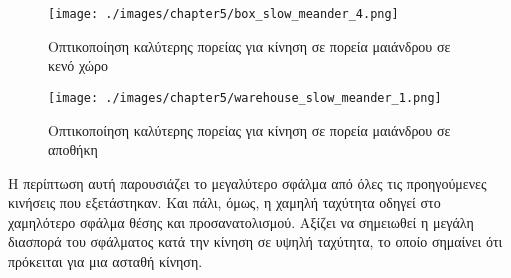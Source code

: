 \begin{figure}[!ht]
    \centering
    \texttt{[image: ./images/chapter5/box\_slow\_meander\_4.png]}
    \caption{Οπτικοποίηση καλύτερης πορείας για κίνηση σε πορεία μαιάνδρου σε κενό χώρο}
    \label{fig:path_meander_slow_corridor}
\end{figure}

\begin{figure}[!ht]
    \centering
    \texttt{[image: ./images/chapter5/warehouse\_slow\_meander\_1.png]}
    \caption{Οπτικοποίηση καλύτερης πορείας για κίνηση σε πορεία μαιάνδρου σε αποθήκη}
    \label{fig:path_meander_slow_warehouse}
\end{figure}

Η περίπτωση αυτή παρουσιάζει το μεγαλύτερο σφάλμα από όλες τις προηγούμενες κινήσεις που εξετάστηκαν. Και πάλι, όμως, η χαμηλή ταχύτητα οδηγεί στο χαμηλότερο σφάλμα θέσης και προσανατολισμού. Αξίζει να σημειωθεί η μεγάλη διασπορά του σφάλματος κατά την κίνηση σε υψηλή ταχύτητα, το οποίο σημαίνει ότι πρόκειται για μια ασταθή κίνηση. 